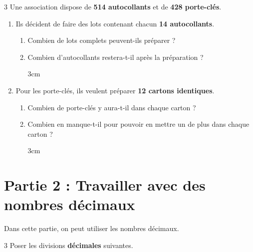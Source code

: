 \documentclass[a4paper]{book}
\begin{document}
{    \begin{exerciceNote}{3}
        Une association dispose de \textbf{514 autocollants} et de \textbf{428 porte-clés}.

        \begin{enumerate}[leftmargin=*]
            \item Ils décident de faire des lots contenant chacun \textbf{14 autocollants}.
            \begin{enumerate}[leftmargin=*]
                \item Combien de lots complets peuvent-ils préparer ?
                \item Combien d'autocollants restera-t-il après la préparation ?

                \begin{ZoneReponse}{3cm}
                \end{ZoneReponse}
            \end{enumerate}
            \item Pour les porte-clés, ils veulent préparer \textbf{12 cartons identiques}.
            \begin{enumerate}[leftmargin=*]
                \item Combien de porte-clés y aura-t-il dans chaque carton ?
                \item Combien en manque-t-il pour pouvoir en mettre un de plus dans chaque carton ?

                \begin{ZoneReponse}{3cm}
                \end{ZoneReponse}
            \end{enumerate}
        \end{enumerate}
    \end{exerciceNote}


\newpage


\raggedright
\section*{Partie 2 : Travailler avec des nombres décimaux}
Dans cette partie, on peut utiliser les nombres décimaux.

    
    \begin{exerciceNote}{3}
        Poser les divisions \textbf{décimales} suivantes.

        \medskip

        \begin{minipage}{0.45\linewidth}
            \quad {}
    

\end{minipage}
\end{exerciceNote}}
\end{document}
